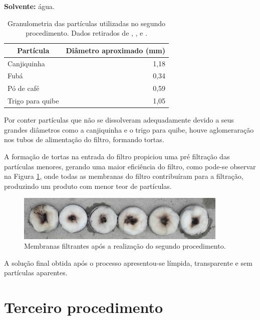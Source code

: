 \textbf{Solvente:} água.


\begin{table}[H]
\centering
\caption{Granulometria das partículas utilizadas no segundo procedimento. Dados
  retirados de ,
  ,  e .}
\label{granulometria2}
\begin{tabular}{@{}lr@{}}
\toprule
\multicolumn{1}{c}{\textbf{Partícula}} & \multicolumn{1}{c}{\textbf{Diâmetro aproximado (\si{mm})}} \\ \midrule
Canjiquinha      & 1,18 \\
Fubá             & 0,34 \\
Pó de café       & 0,59 \\
Trigo para quibe & 1,05 \\  \bottomrule
\end{tabular}
\end{table}

Por conter partículas que não se dissolveram adequadamente devido a seus grandes
diâmetros como a canjiquinha e o trigo para quibe, houve aglomeraração nos tubos
de alimentação do filtro, formando tortas.

A formação de tortas na entrada do filtro propiciou uma pré filtração das
partículas menores, gerando uma maior eficiência do filtro, como pode-se
observar na Figura \ref{fig:proc2}, onde todas as membranas do filtro
contribuíram para a filtração, produzindo um produto com menor teor de
partículas.

\begin{figure}[H]
  \centering
  \includegraphics[width=0.9\textwidth]{figuras/proc2.png}
  \caption{Membranas filtrantes após a realização do segundo
    procedimento.\label{fig:proc2}}
\end{figure}

A solução final obtida após o processo apresentou-se límpida, transparente e sem
partículas aparentes.


\section{Terceiro procedimento}
\label{sec:proc3}

